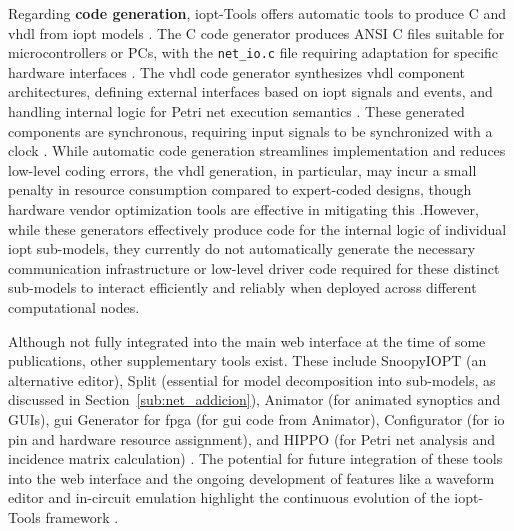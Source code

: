 Regarding \textbf{code generation}, \gls{iopt}-Tools offers automatic tools to produce C and \gls{vhdl} from \gls{iopt} models \cite{manual, vhld}. The C code generator produces ANSI C files suitable for microcontrollers or PCs, with the \texttt{net\_io.c} file requiring adaptation for specific hardware interfaces \cite{manual}. The \gls{vhdl} code generator synthesizes \gls{vhdl} component architectures, defining external interfaces based on \gls{iopt} signals and events, and handling internal logic for Petri net execution semantics \cite{vhld}. These generated components are synchronous, requiring input signals to be synchronized with a clock \cite{vhld}. While automatic code generation streamlines implementation and reduces low-level coding errors, the \gls{vhdl} generation, in particular, may incur a small penalty in resource consumption compared to expert-coded designs, though hardware vendor optimization tools are effective in mitigating this \cite{vhld}.However, while these generators effectively produce code for the internal logic of individual \gls{iopt} sub-models, they currently do not automatically generate the necessary communication infrastructure or low-level driver code required for these distinct sub-models to interact efficiently and reliably when deployed across different computational nodes.

Although not fully integrated into the main web interface at the time of some publications, other supplementary tools exist. These include SnoopyIOPT (an alternative editor), Split (essential for model decomposition into sub-models, as discussed in Section~\ref{sub:net_addicion}), Animator (for animated synoptics and GUIs), \gls{gui} Generator for \gls{fpga} (for \gls{gui} code from Animator), Configurator (for \gls{io} pin and hardware resource assignment), and HIPPO (for Petri net analysis and incidence matrix calculation) \cite{manual}. The potential for future integration of these tools into the web interface and the ongoing development of features like a waveform editor and in-circuit emulation highlight the continuous evolution of the \gls{iopt}-Tools framework \cite{2015gomes, manual}.





